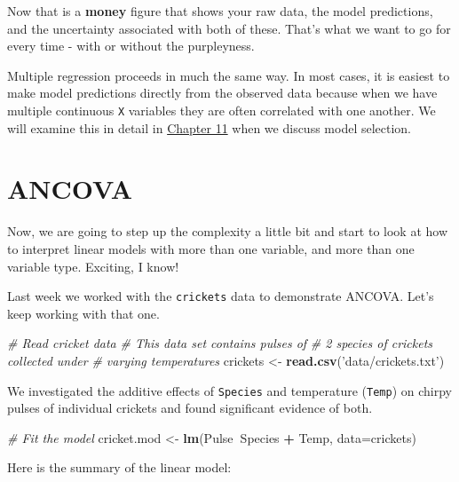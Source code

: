 \documentclass[
]{book}
\newenvironment{Shaded}{\begin{snugshade}}{\end{snugshade}}
\newcommand{\CommentTok}[1]{\textcolor[rgb]{0.56,0.35,0.01}{\textit{#1}}}
\newcommand{\DataTypeTok}[1]{\textcolor[rgb]{0.13,0.29,0.53}{#1}}
\newcommand{\KeywordTok}[1]{\textcolor[rgb]{0.13,0.29,0.53}{\textbf{#1}}}
\newcommand{\NormalTok}[1]{#1}
\newcommand{\OperatorTok}[1]{\textcolor[rgb]{0.81,0.36,0.00}{\textbf{#1}}}
\newcommand{\StringTok}[1]{\textcolor[rgb]{0.31,0.60,0.02}{#1}}
\begin{document}
Now that is a \textbf{money} figure that shows your raw data, the model predictions, and the uncertainty associated with both of these. That's what we want to go for every time - with or without the purpleyness.

Multiple regression proceeds in much the same way. In most cases, it is easiest to make model predictions directly from the observed data because when we have multiple continuous \texttt{X} variables they are often correlated with one another. We will examine this in detail in \protect\hyperlink{Chapter11}{Chapter 11} when we discuss model selection.

\hypertarget{ancova}{%
\section{ANCOVA}\label{ancova}}

Now, we are going to step up the complexity a little bit and start to look at how to interpret linear models with more than one variable, and more than one variable type. Exciting, I know!

Last week we worked with the \texttt{crickets} data to demonstrate ANCOVA. Let's keep working with that one.

\begin{Shaded}
\begin{Highlighting}[]
\CommentTok{# Read cricket data}
\CommentTok{# This data set contains pulses of}
\CommentTok{# 2 species of crickets collected under}
\CommentTok{# varying temperatures}
\NormalTok{  crickets <-}\StringTok{ }\KeywordTok{read.csv}\NormalTok{(}\StringTok{'data/crickets.txt'}\NormalTok{)}
\end{Highlighting}
\end{Shaded}

We investigated the additive effects of \texttt{Species} and temperature (\texttt{Temp}) on chirpy pulses of individual crickets and found significant evidence of both.

\begin{Shaded}
\begin{Highlighting}[]
\CommentTok{# Fit the model}
\NormalTok{cricket.mod <-}\StringTok{ }\KeywordTok{lm}\NormalTok{(Pulse}\OperatorTok{~}\NormalTok{Species }\OperatorTok{+}\StringTok{ }\NormalTok{Temp, }\DataTypeTok{data=}\NormalTok{crickets)}
\end{Highlighting}
\end{Shaded}

Here is the summary of the linear model:
\end{document}

